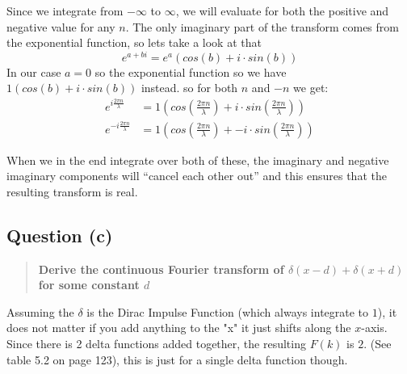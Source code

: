 


Since we integrate from $-\infty$ to $\infty$, we will evaluate for both the
positive and negative value for any $n$.  The only imaginary part of the
transform comes from the exponential function, so lets take a look at that
\[
    e^{a+bi} = e^a (cos(b) + i\cdot sin(b))
\]
In our case $a = 0$ so the exponential function so we have $1(cos(b) + i\cdot sin(b))$
instead. so for both $n$ and $-n$ we get:
\begin{align*}
  e^{i\frac{2 \pi n}{\lambda}} &= 1(cos(\frac{2 \pi n}{\lambda}) + i\cdot sin(\frac{2 \pi n}{\lambda}))\\
  e^{-i\frac{2 \pi n}{\lambda}} &= 1(cos(\frac{2 \pi n}{\lambda}) + -i\cdot sin(\frac{2 \pi n}{\lambda}))
\end{align*}

When we in the end integrate over both of these, the imaginary and negative
imaginary components will ``cancel each other out'' and this ensures that the
resulting transform is real.

\subsection{Question (c)}
\begin{quote}
  \textbf{Derive the continuous Fourier transform of $\delta(x - d) + \delta(x +
    d)$ for some constant $d$}
\end{quote}

Assuming the $\delta$ is the Dirac Impulse Function (which always integrate to
$1$), it does not matter if you add anything to the "x" it just shifts along the
$x$-axis. Since there is 2 delta functions added together, the resulting $F(k)$ is
$2$. (See table 5.2 on page 123), this is just for a single delta function
though.

